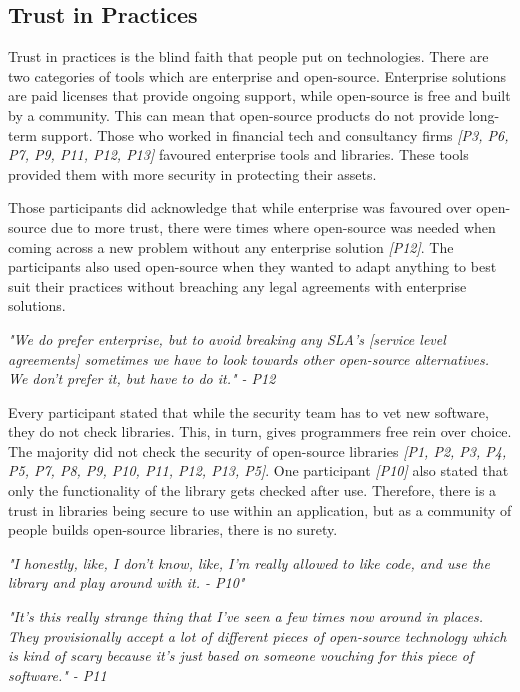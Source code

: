 \subsection{Trust in Practices}

Trust in practices is the blind faith that people put on technologies. There are two categories of tools which are enterprise and open-source. Enterprise solutions are paid licenses that provide ongoing support, while open-source is free and built by a community. This can mean that open-source products do not provide long-term support. Those who worked in financial tech and consultancy firms \textit{[P3, P6, P7, P9, P11, P12, P13]} favoured enterprise tools and libraries. These tools provided them with more security in protecting their assets. 
\newline
\par
Those participants did acknowledge that while enterprise was favoured over open-source due to more trust, there were times where open-source was needed when coming across a new problem without any enterprise solution \textit{[P12]}. The participants also used open-source when they wanted to adapt anything to best suit their practices without breaching any legal agreements with enterprise solutions. 
\newline
\par
\textit{"We do prefer enterprise, but to avoid breaking any SLA's [service level agreements] sometimes we have to look towards other open-source alternatives. We don't prefer it, but have to do it." - P12}
\newline
\par
Every participant stated that while the security team has to vet new software, they do not check libraries. This, in turn, gives programmers free rein over choice. The majority did not check the security of open-source libraries \textit{[P1, P2, P3, P4, P5, P7, P8, P9, P10, P11, P12, P13, P5]}. One participant \textit{[P10]} also stated that only the functionality of the library gets checked after use. Therefore, there is a trust in libraries being secure to use within an application, but as a community of people builds open-source libraries, there is no surety. 
\newline
\par
\textit{"I honestly, like, I don't know, like, I'm really allowed to like code, and use the library and play around with it. - P10"}
\newline
\par
\textit{"It's this really strange thing that I've seen a few times now around in places. They provisionally accept a lot of different pieces of open-source technology which is kind of scary because it's just based on someone vouching for this piece of software." - P11}
